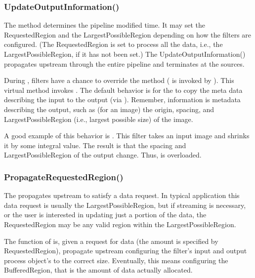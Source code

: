 \subsubsection{UpdateOutputInformation()}
\label{sec:UpdateOutputInformation}

The  method determines the pipeline modified
time. It may set the RequestedRegion and the LargestPossibleRegion depending
on how the filters are configured. (The RequestedRegion is set to process all
the data, i.e., the LargestPossibleRegion, if it has not been set.) The
UpdateOutputInformation() propagates upstream through the entire pipeline and
terminates at the sources.

During , filters have a chance to override the
 method
( is invoked by
). This virtual method invokes
. The default behavior is for the
 to copy the meta data describing the input
to the output (via ). Remember, information
is metadata describing the output, such as (for an image) the origin, spacing,
and LargestPossibleRegion (i.e., largest possible size) of the image.

A good example of this behavior is . This filter
takes an input image and shrinks it by some integral value. The result is that
the spacing and LargestPossibleRegion of the output change. Thus,
 is overloaded.

\subsubsection{PropagateRequestedRegion()}
\label{sec:PropagateRequestedRegion}

The  propagates upstream to satisfy a data
request. In typical application this data request is usually the
LargestPossibleRegion, but if streaming is necessary, or the user is
interested in updating just a portion of the data, the RequestedRegion may be
any valid region within the LargestPossibleRegion.

The function of  is, given a request for data (the
amount is specified by RequestedRegion), propagate upstream configuring the
filter's input and output process object's to the correct size. Eventually,
this means configuring the BufferedRegion, that is the amount of data
actually allocated.

